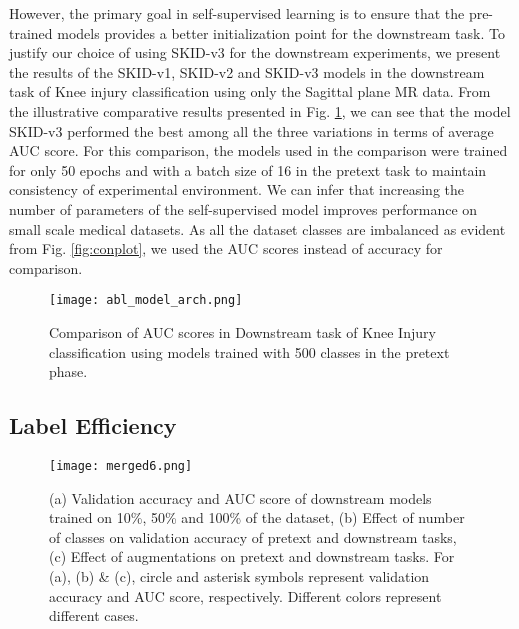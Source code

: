 \documentclass[journal]{IEEEtai}
\begin{document}
However, the primary goal in self-supervised learning is to ensure that the pre-trained models provides a better initialization point for the downstream task. To justify our choice of using SKID-v3 for the downstream experiments, we present the results of the SKID-v1, SKID-v2 and SKID-v3 models in the downstream task of Knee injury classification using only the Sagittal plane MR data. From the illustrative comparative results presented in Fig. \ref{fig:model_abl_arch_500}, we can see that the model SKID-v3 performed the best among all the three variations in terms of average AUC score. For this comparison, the models used in the comparison were trained for only 50 epochs and with a batch size of 16 in the pretext task to maintain consistency of experimental environment. We can infer that increasing the number of parameters of the self-supervised model improves performance on small scale medical datasets. As all the dataset classes are imbalanced as evident from Fig. \ref{fig:conplot}, we used the AUC scores instead of accuracy for comparison.

\begin{figure}
    \centering
    \texttt{[image: abl\_model\_arch.png]}
    \caption{Comparison of AUC scores in Downstream task of Knee Injury classification using models trained with 500 classes in the pretext phase.}
    \label{fig:model_abl_arch_500}
\end{figure}

\subsection{Label Efficiency}
\label{subsec:label_eff}

\begin{figure*}[!h]
    \centering
    \texttt{[image: merged6.png]}
    \caption{(a) Validation accuracy and AUC score of downstream models trained on 10\%, 50\% and 100\% of the dataset, (b) Effect of number of classes on validation accuracy of pretext and downstream tasks, (c) Effect of augmentations on pretext and downstream tasks. For (a), (b) \& (c), circle and asterisk symbols represent validation accuracy and AUC score, respectively. Different colors represent different cases.}
    \label{fig:more_ablation}
\end{figure*}
\end{document}
